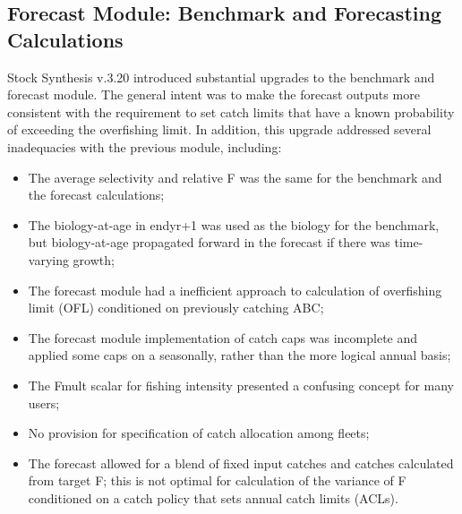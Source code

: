 \hypertarget{appendB}{}
\subsection{Forecast Module: Benchmark and Forecasting Calculations}
\label{sec:forecast}

Stock Synthesis v.3.20 introduced substantial upgrades to the benchmark and forecast module. The general intent was to make the forecast outputs more consistent with the requirement to set catch limits that have a known probability of exceeding the overfishing limit. In addition, this upgrade addressed several inadequacies with the previous module, including:

\begin{itemize}
	\item The average selectivity and relative F was the same for the benchmark and the forecast calculations;
	\item The biology-at-age in endyr+1 was used as the biology for the benchmark, but biology-at-age propagated forward in the forecast if there was time-varying growth;
	\item The forecast module had a inefficient approach to calculation of overfishing limit (OFL) conditioned on previously catching ABC;
	\item The forecast module implementation of catch caps was incomplete and applied some caps on a seasonally, rather than the more logical annual basis;
	\item The Fmult scalar for fishing intensity presented a confusing concept for many users;
	\item No provision for specification of catch allocation among fleets;
	\item The forecast allowed for a blend of fixed input catches and catches calculated from target F; this is not optimal for calculation of the variance of F conditioned on a catch policy that sets annual catch limits (ACLs).
\end{itemize}

